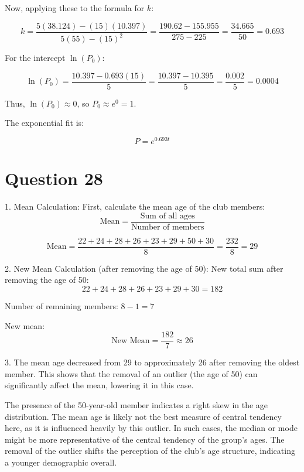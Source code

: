 \documentclass[11pt]{article}
\begin{document}
Now, applying these to the formula for \( k \):

\[
k = \frac{5(38.124) - (15)(10.397)}{5(55) - (15)^2} = \frac{190.62 - 155.955}{275 - 225} = \frac{34.665}{50} = 0.693
\]

For the intercept \( \ln(P_0) \):

\[
\ln(P_0) = \frac{10.397 - 0.693(15)}{5} = \frac{10.397 - 10.395}{5} = \frac{0.002}{5} = 0.0004
\]

Thus, \( \ln(P_0) \approx 0 \), so \( P_0 \approx e^0 = 1 \).

The exponential fit is:

\[
P = e^{0.693t}
\]


\section*{Question 28}

1. Mean Calculation:
   First, calculate the mean age of the club members:
   \[
   \text{Mean} = \frac{\text{Sum of all ages}}{\text{Number of members}}
   \]

   \[
   \text{Mean} = \frac{22 + 24 + 28 + 26 + 23 + 29 + 50 + 30}{8} = \frac{232}{8} = 29
   \]

2. New Mean Calculation (after removing the age of 50):
   New total sum after removing the age of 50:
   \[
   22 + 24 + 28 + 26 + 23 + 29 + 30 = 182
   \]

   Number of remaining members: \( 8 - 1 = 7 \)

   New mean:
   \[
   \text{New Mean} = \frac{182}{7} \approx 26
   \]

3. 
   The mean age decreased from 29 to approximately 26 after removing the oldest member. This shows that the removal of an outlier (the age of 50) can significantly affect the mean, lowering it in this case.

   The presence of the 50-year-old member indicates a right skew in the age distribution. The mean age is likely not the best measure of central tendency here, as it is influenced heavily by this outlier. In such cases, the median or mode might be more representative of the central tendency of the group's ages. The removal of the outlier shifts the perception of the club's age structure, indicating a younger demographic overall.
\end{document}

